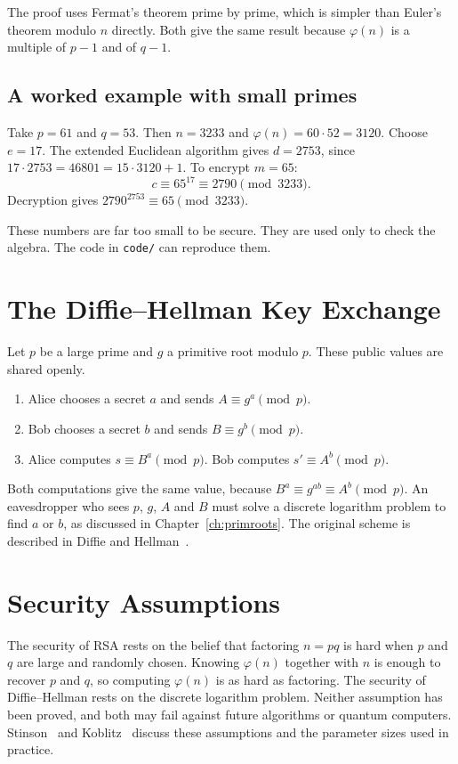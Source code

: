 \begin{remark}
The proof uses Fermat's theorem prime by prime, which is simpler than Euler's theorem modulo $n$ directly. Both give the same result because $\varphi(n)$ is a multiple of $p-1$ and of $q-1$.
\end{remark}

\subsection{A worked example with small primes}

Take $p=61$ and $q=53$. Then $n=3233$ and $\varphi(n)=60\cdot 52=3120$. Choose $e=17$. The extended Euclidean algorithm gives $d=2753$, since $17\cdot 2753=46801=15\cdot 3120+1$. To encrypt $m=65$:
\[
  c\equiv 65^{17}\equiv 2790\pmod{3233}.
\]
Decryption gives $2790^{2753}\equiv 65\pmod{3233}$.

These numbers are far too small to be secure. They are used only to check the algebra. The code in \texttt{code/} can reproduce them.

\section{The Diffie--Hellman Key Exchange}

Let $p$ be a large prime and $g$ a primitive root modulo $p$. These public values are shared openly.

\begin{enumerate}
  \item Alice chooses a secret $a$ and sends $A\equiv g^a\pmod p$.
  \item Bob chooses a secret $b$ and sends $B\equiv g^b\pmod p$.
  \item Alice computes $s\equiv B^a\pmod p$. Bob computes $s'\equiv A^b\pmod p$.
\end{enumerate}

Both computations give the same value, because $B^a\equiv g^{ab}\equiv A^b\pmod p$. An eavesdropper who sees $p$, $g$, $A$ and $B$ must solve a discrete logarithm problem to find $a$ or $b$, as discussed in Chapter~\ref{ch:primroots}. The original scheme is described in Diffie and Hellman~\cite{diffie1976}.

\section{Security Assumptions}

The security of RSA rests on the belief that factoring $n=pq$ is hard when $p$ and $q$ are large and randomly chosen. Knowing $\varphi(n)$ together with $n$ is enough to recover $p$ and $q$, so computing $\varphi(n)$ is as hard as factoring. The security of Diffie--Hellman rests on the discrete logarithm problem. Neither assumption has been proved, and both may fail against future algorithms or quantum computers. Stinson~\cite{stinson2006} and Koblitz~\cite{koblitz1994} discuss these assumptions and the parameter sizes used in practice.

